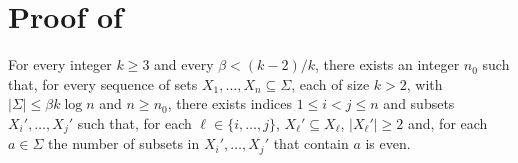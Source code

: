 \documentclass{patmorin}
\begin{document}
\section{Proof of }

\begin{lem}
   For every integer $k\ge 3$ and every $\beta < (k-2)/k$, there
   exists an integer $n_0$ such that, for every sequence of sets
   $X_1,\ldots,X_n\subseteq\Sigma$, each of size $k>2$, with $|\Sigma|\le
   \beta k\log n$ and $n\ge n_0$, there
   exists indices $1\le i< j\le n$ and subsets $X_i',\ldots,X_j'$ such
   that, for each $\ell\in\{i,\ldots,j\}$,  $X_\ell'\subseteq X_\ell$,
   $|X_\ell'|\ge 2$ and, for each $a\in\Sigma$ the number of subsets in
   $X_i',\ldots,X_j'$ that contain $a$ is even.
\end{lem}
\end{document}
